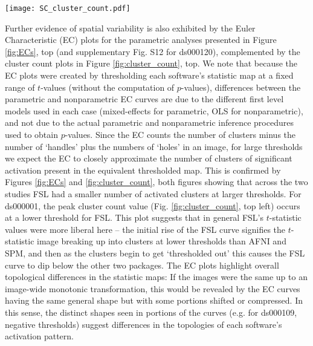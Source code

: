 \begin{sidewaysfigure}[htbp]
\centering
	\texttt{[image: SC\_cluster\_count.pdf]}	
\caption{Cluster count plots for ds000001 and ds000109. On top, comparisons of the number of cluster found in each software's $t$-statistic map from our reanalyses using a range of $t$-value thresholds between -6 and 6. Below, comparisons of the cluster counts calculated using the same thresholds on the corresponding $t$-statistic images for permutation inference within each package.}
\label{fig:cluster_count}
\end{sidewaysfigure}

Further evidence of spatial variability is also exhibited by the Euler Characteristic (EC) plots for the parametric analyses presented in Figure \ref{fig:ECs}, top (and supplementary Fig. S12 for ds000120), complemented by the cluster count plots in Figure \ref{fig:cluster_count}, top. We note that because the EC plots were created by thresholding each software's statistic map at a fixed range of $t$-values (without the computation of $p$-values), differences between the parametric and nonparametric EC curves are due to the different first level models used in each case (mixed-effects for parametric, OLS for nonparametric), and not due to the actual parametric and nonparametric inference procedures used to obtain $p$-values. Since the EC counts the number of clusters minus the number of `handles' plus the numbers of `holes' in an image, for large thresholds we expect the EC to closely approximate the number of clusters of significant activation present in the equivalent thresholded map. This is confirmed by Figures \ref{fig:ECs} and \ref{fig:cluster_count}, both figures showing that across the two studies FSL had a smaller number of activated clusters at larger thresholds. For ds000001, the peak cluster count value (Fig. \ref{fig:cluster_count}, top left) occurs at a lower threshold for FSL. This plot suggests that in general FSL's $t$-statistic values were more liberal here -- the initial rise of the FSL curve signifies the $t$-statistic image breaking up into clusters at lower thresholds than AFNI and SPM, and then as the clusters begin to get `thresholded out' this causes the FSL curve to dip below the other two packages. The EC plots highlight overall topological differences in the statistic maps: If the images were the same up to an image-wide monotonic transformation, this would be revealed by the EC curves having the same general shape but with some portions shifted or compressed. In this sense, the distinct shapes seen in portions of the curves (e.g. for ds000109, negative thresholds) suggest differences in the topologies of each software's activation pattern. 

